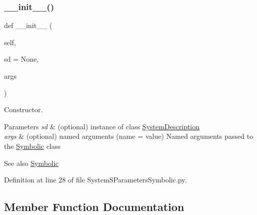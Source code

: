 \subsubsection{\texorpdfstring{\+\_\+\+\_\+init\+\_\+\+\_\+()}{\_\_init\_\_()}}
{\footnotesize\ttfamily def \+\_\+\+\_\+init\+\_\+\+\_\+ (\begin{DoxyParamCaption}\item[{}]{self,  }\item[{}]{sd = {\ttfamily None},  }\item[{}]{args }\end{DoxyParamCaption})}



Constructor. 


\begin{DoxyParams}{Parameters}
{\em sd} & (optional) instance of class \hyperlink{namespaceSignalIntegrity_1_1SystemDescriptions_1_1SystemDescription}{System\+Description} \\
\hline
{\em args} & (optional) named arguments (name = value) Named arguments passed to the \hyperlink{namespaceSignalIntegrity_1_1SystemDescriptions_1_1Symbolic}{Symbolic} class \\
\hline
\end{DoxyParams}
\begin{DoxySeeAlso}{See also}
\hyperlink{namespaceSignalIntegrity_1_1SystemDescriptions_1_1Symbolic}{Symbolic} 
\end{DoxySeeAlso}


Definition at line 28 of file System\+S\+Parameters\+Symbolic.\+py.



\subsection{Member Function Documentation}
\mbox{\label{classSignalIntegrity_1_1SystemDescriptions_1_1SystemSParametersSymbolic_1_1SystemSParametersSymbolic_af98307fa6ec51f1bd11fe6abebbb9595}} 
